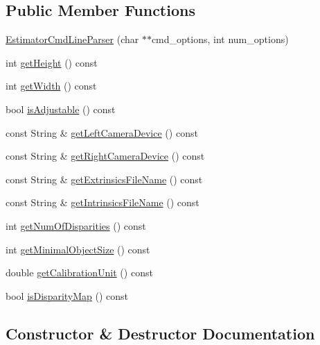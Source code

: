 \subsection*{Public Member Functions}
\begin{DoxyCompactItemize}
\item 
\hyperlink{classEstimatorCmdLineParser_a63d7e43b228b8a91808d5a9d294866fd}{Estimator\+Cmd\+Line\+Parser} (char $\ast$$\ast$cmd\+\_\+options, int num\+\_\+options)
\item 
int \hyperlink{classEstimatorCmdLineParser_a20a512e1e58330dfb8f1ab72db990200}{get\+Height} () const 
\item 
int \hyperlink{classEstimatorCmdLineParser_ac41c01b0d7f2804842e6288e09d77182}{get\+Width} () const 
\item 
bool \hyperlink{classEstimatorCmdLineParser_a6cb61d5b5337cf23d4e35eb6b4ea2bcd}{is\+Adjustable} () const 
\item 
const String \& \hyperlink{classEstimatorCmdLineParser_a50d983eb935a86bd0834b35092a8669e}{get\+Left\+Camera\+Device} () const 
\item 
const String \& \hyperlink{classEstimatorCmdLineParser_a2ebbfb26a0a57f47003cd063b987f565}{get\+Right\+Camera\+Device} () const 
\item 
const String \& \hyperlink{classEstimatorCmdLineParser_aec4d9e6eef122e68689a3f3cf7405de8}{get\+Extrinsics\+File\+Name} () const 
\item 
const String \& \hyperlink{classEstimatorCmdLineParser_aa132b17af56498023d77d9b05313ff9f}{get\+Intrinsics\+File\+Name} () const 
\item 
int \hyperlink{classEstimatorCmdLineParser_a088ac9d1832dad1b27b0d6760837fd8f}{get\+Num\+Of\+Disparities} () const 
\item 
int \hyperlink{classEstimatorCmdLineParser_ad52089aede854ef22a402cc9d292c353}{get\+Minimal\+Object\+Size} () const 
\item 
double \hyperlink{classEstimatorCmdLineParser_a500dd919b026ea289aa4395d67e9259c}{get\+Calibration\+Unit} () const 
\item 
bool \hyperlink{classEstimatorCmdLineParser_aed638d37a28b85d2aa822b8cc58c11de}{is\+Disparity\+Map} () const 
\end{DoxyCompactItemize}


\subsection{Constructor \& Destructor Documentation}
